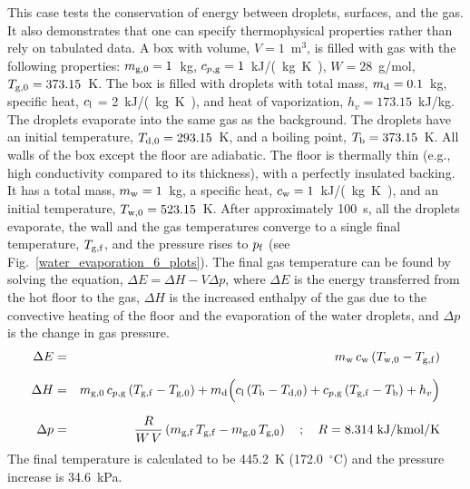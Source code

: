 \documentclass[11pt]{book}
\begin{document}
This case tests the conservation of energy between droplets, surfaces, and the gas. It also demonstrates that one can specify thermophysical properties rather than rely on tabulated data. A box with volume, $V=1$~m$^3$, is filled with gas with the following properties: $m_{\rm g,0}=1$~kg, $c_{p,\rm g}=1$~\si{kJ/(kg.K)}, $W=28$~g/mol, $T_{{\rm g},0}=373.15$~K.  The box is filled with droplets with total mass, $m_{\rm d}=0.1$~kg, specific heat, $c_{\rm l}$ = 2~\si{kJ/(kg.K)}, and heat of vaporization, $h_v=173.15$~kJ/kg. The droplets evaporate into the same gas as the background.  The droplets have an initial temperature, $T_{\rm d,0}=293.15$~K, and a boiling point, $T_{\rm b}=373.15$~K. All walls of the box except the floor are adiabatic.  The floor is thermally thin (e.g., high conductivity compared to its thickness), with a perfectly insulated backing. It has a total mass, $m_{\rm w}=1$~kg, a specific heat, $c_{\rm w}=1$~\si{kJ/(kg.K)}, and an initial temperature, $T_{\rm w,0}=523.15$~K.  After approximately 100~s, all the droplets evaporate, the wall and the gas temperatures converge to a single final temperature, $T_{\rm g,f}$, and the pressure rises to $p_{\rm f}$ (see Fig.~\ref{water_evaporation_6_plots}). The final gas temperature can be found by solving the equation, $\Delta E = \Delta H - V \Delta p$, where $\Delta E$ is the energy transferred from the hot floor to the gas, $\Delta H$ is the increased enthalpy of the gas due to the convective heating of the floor and the evaporation of the water droplets, and $\Delta p$ is the change in gas pressure.
\begin{eqnarray*}
\Delta E &=& m_{\rm w} \, c_{\rm w} \, (T_{{\rm w},0}-T_{\rm g,f}) \\[.1in]
\Delta H &=& m_{\rm g,0} \, c_{p,{\rm g}} \, (T_{\rm g,f}-T_{\rm g,0} ) + m_{\rm d} \Big( c_{\rm l} \, (T_{\rm b}-T_{\rm d,0}) + c_{p,{\rm g}} \, (T_{\rm g,f}-T_{\rm b}) + h_v  \Big) \\[.1in]
\Delta p &=& \frac{R}{W \, V} \left( m_{\rm g,f} \, T_{\rm g,f} - m_{\rm g,0} \, T_{\rm g,0} \right) \quad ; \quad R = 8.314 \; \hbox{kJ/kmol/K}
\end{eqnarray*}
The final temperature is calculated to be 445.2~K (172.0~$^\circ$C) and the pressure increase is 34.6~kPa.
\end{document}
